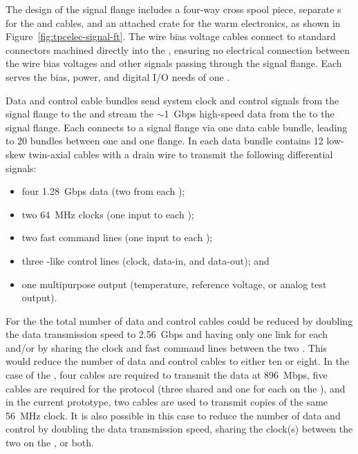 The design of the signal flange includes a four-way cross spool 
piece, separate  \fdth{}s for the  and 
 cables, and an attached crate for the  
warm electronics, as shown in Figure~\ref{fig:tpcelec-signal-ft}.
The wire bias voltage cables connect to standard  
connectors machined directly into the  \fdth{}, ensuring 
no electrical connection between the wire bias voltages and other 
signals passing through the signal flange. Each  \fdth 
serves the bias, power, and digital I/O needs of one .  

Data and control cable bundles send system clock and control signals 
from the signal flange to the  and stream the $\sim$\SI{1}{Gbps} 
high-speed data from the  to the signal flange. Each 
 connects to a signal flange via one data cable bundle, 
leading to \num{20} bundles between one  and one flange. 
In  each data bundle contains \num{12} low-skew twin-axial cables with a drain 
wire to transmit the following differential signals:
\begin{itemize}
\item four \SI{1.28}{Gbps} data (two from each );
\item two \SI{64}{MHz} clocks (one input to each );
\item two fast command lines (one input to each );
\item three -like control lines (clock, data-in, and data-out); and
\item one multipurpose  output (temperature, 
reference voltage, or analog test output).
\end{itemize}
For the   the total number of data and control cables could be 
reduced by doubling the data transmission speed to \SI{2.56}{Gbps}
and having only one link for each  and/or by
sharing the clock and fast command lines between the two 
 . This would reduce the number
of data and control cables to either ten or eight. In the
case of the , four cables are required to transmit
the data at \SI{896}{Mbps}, five cables are required for the
 protocol (three shared and one for each 
on the ), and in the current  prototype, 
two cables are used to transmit copies of the same \SI{56}{MHz}
clock. It is also possible in this case to reduce the 
number of data and control  by %
doubling the data transmission 
speed, %
sharing the clock(s) between the two  
on the , or %
both.

